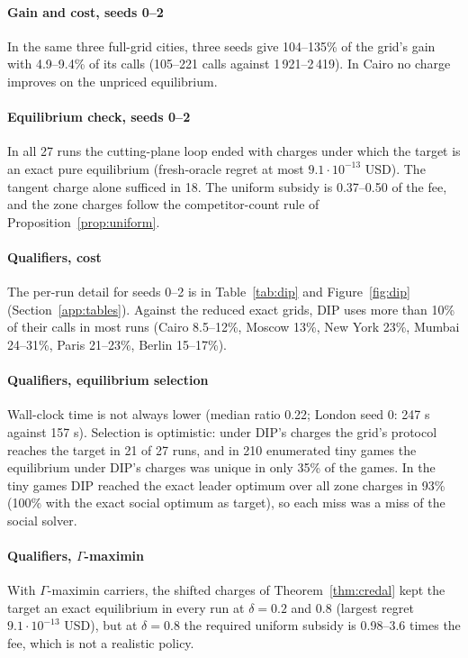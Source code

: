 \documentclass[preprint,11pt]{elsarticle}
\theoremstyle{definition}
\theoremstyle{remark}
\begin{document}
\paragraph{Gain and cost, seeds 0--2} In the same three full-grid cities, three seeds give 104--135\% of the grid's gain with 4.9--9.4\% of its calls (105--221 calls against 1\,921--2\,419). In Cairo no charge improves on the unpriced equilibrium.

\paragraph{Equilibrium check, seeds 0--2} In all 27 runs the cutting-plane loop ended with charges under which the target is an exact pure equilibrium (fresh-oracle regret at most $9.1\cdot10^{-13}$ USD). The tangent charge alone sufficed in 18. The uniform subsidy is 0.37--0.50 of the fee, and the zone charges follow the competitor-count rule of Proposition~\ref{prop:uniform}.

\paragraph{Qualifiers, cost} The per-run detail for seeds 0--2 is in Table~\ref{tab:dip} and Figure~\ref{fig:dip} (Section~\ref{app:tables}). Against the reduced exact grids, DIP uses more than 10\% of their calls in most runs (Cairo 8.5--12\%, Moscow 13\%, New York 23\%, Mumbai 24--31\%, Paris 21--23\%, Berlin 15--17\%).

\paragraph{Qualifiers, equilibrium selection} Wall-clock time is not always lower (median ratio 0.22; London seed 0: 247 s against 157 s). Selection is optimistic: under DIP's charges the grid's protocol reaches the target in 21 of 27 runs, and in 210 enumerated tiny games the equilibrium under DIP's charges was unique in only 35\% of the games. In the tiny games DIP reached the exact leader optimum over all zone charges in 93\% (100\% with the exact social optimum as target), so each miss was a miss of the social solver.

\paragraph{Qualifiers, $\Gamma$-maximin} With $\Gamma$-maximin carriers, the shifted charges of Theorem~\ref{thm:credal} kept the target an exact equilibrium in every run at $\delta=0.2$ and $0.8$ (largest regret $9.1\cdot10^{-13}$ USD), but at $\delta=0.8$ the required uniform subsidy is 0.98--3.6 times the fee, which is not a realistic policy.
\end{document}
